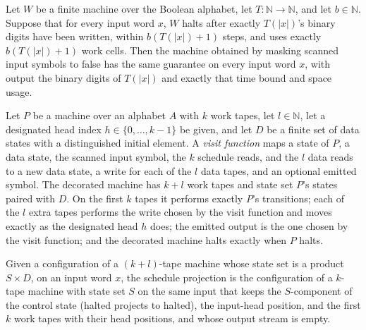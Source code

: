 \begin{lemma}
\label{Complexity.maskedClock_computes}
\leanok
{}
Let $W$ be a finite machine over the Boolean alphabet, let $T:\mathbb{N}\to\mathbb{N}$,
and let $b\in\mathbb{N}$. Suppose that for every input word $x$, $W$ halts after exactly
$T(|x|)$'s binary digits have been written, within $b(T(|x|)+1)$ steps, and uses exactly
$b(T(|x|)+1)$ work cells. Then the machine obtained by masking scanned input symbols to
false has the same guarantee on every input word $x$, with output the binary digits of
$T(|x|)$ and exactly that time bound and space usage.
\end{lemma}

\begin{definition}
\label{Complexity.decorateTM}
\leanok
{}
Let $P$ be a machine over an alphabet $A$ with $k$ work tapes, let $l \in \mathbb{N}$,
let a designated head index $h \in \{0, \dots, k-1\}$ be given, and let $D$ be a
finite set of data states with a distinguished initial element. A \emph{visit
function} maps a state of $P$, a data state, the scanned input symbol, the $k$
schedule reads, and the $l$ data reads to a new data state, a write for each of the
$l$ data tapes, and an optional emitted symbol. The decorated machine has $k + l$
work tapes and state set $P$'s states paired with $D$. On the first $k$ tapes it
performs exactly $P$'s transitions; each of the $l$ extra tapes performs the write
chosen by the visit function and moves exactly as the designated head $h$ does; the
emitted output is the one chosen by the visit function; and the decorated machine
halts exactly when $P$ halts.
\end{definition}

\begin{definition}
\label{Complexity.scheduleCfg}
\leanok
{}
Given a configuration of a $(k+l)$-tape machine whose state set is a product
$S \times D$, on an input word $x$, the schedule projection is the configuration of a
$k$-tape machine with state set $S$ on the same input that keeps the $S$-component of
the control state (halted projects to halted), the input-head position, and the first
$k$ work tapes with their head positions, and whose output stream is empty.
\end{definition}

